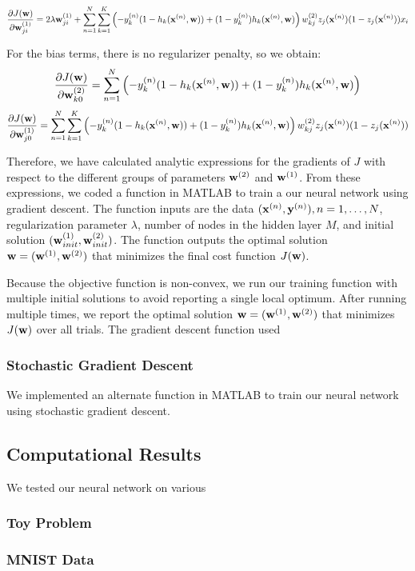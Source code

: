 \begin{equation}
\frac{\partial J(\boldsymbol{\mathbf{w}})}{\partial \boldsymbol{\mathbf{w}}^{(1)}_{ji}} =  2 \lambda \boldsymbol{\mathbf{w}}^{(1)}_{ji} + \sum_{n=1}^{N} \sum_{k=1}^{K} \left(-y_k^{(n)}(1 - h_k(\boldsymbol{\mathbf{x}}^{(n)},\boldsymbol{\mathbf{w}})) + (1-y_k^{(n)})h_k(\boldsymbol{\mathbf{x}}^{(n)},\boldsymbol{\mathbf{w}}) \right)w_{kj}^{(2)} z_j(\boldsymbol{\mathbf{x}}^{(n)})(1-z_j(\boldsymbol{\mathbf{x}}^{(n)})) x_i
\end{equation}

For the bias terms, there is no regularizer penalty, so we obtain:
\begin{equation}
\frac{\partial J(\boldsymbol{\mathbf{w}})}{\partial \boldsymbol{\mathbf{w}}^{(2)}_{k0}} = \sum_{n=1}^{N} \left(-y_k^{(n)}(1 - h_k(\boldsymbol{\mathbf{x}}^{(n)},\boldsymbol{\mathbf{w}})) + (1-y_k^{(n)})h_k(\boldsymbol{\mathbf{x}}^{(n)},\boldsymbol{\mathbf{w}}) \right)
\end{equation}
\begin{equation}
\frac{\partial J(\boldsymbol{\mathbf{w}})}{\partial \boldsymbol{\mathbf{w}}^{(1)}_{j0}} =  \sum_{n=1}^{N} \sum_{k=1}^{K} \left(-y_k^{(n)}(1 - h_k(\boldsymbol{\mathbf{x}}^{(n)},\boldsymbol{\mathbf{w}})) + (1-y_k^{(n)})h_k(\boldsymbol{\mathbf{x}}^{(n)},\boldsymbol{\mathbf{w}}) \right)w_{kj}^{(2)} z_j(\boldsymbol{\mathbf{x}}^{(n)})(1-z_j(\boldsymbol{\mathbf{x}}^{(n)}))
\end{equation}

Therefore, we have calculated analytic expressions for the gradients of $J$ with respect to the different groups of parameters $\boldsymbol{\mathbf{w}}^{(2)}$ and $\boldsymbol{\mathbf{w}}^{(1)}$.  From these expressions, we coded a function in MATLAB to train a our neural network using gradient descent.  The function inputs are the data $(\boldsymbol{\mathbf{x}}^{(n)},\boldsymbol{\mathbf{y}}^{(n)}), n = 1, \ldots, N$, regularization parameter $\lambda$, number of nodes in the hidden layer $M$, and initial solution $(\boldsymbol{\mathbf{w}}^{(1)}_{init}, \boldsymbol{\mathbf{w}}^{(2)}_{init})$.  The function outputs the optimal solution $\boldsymbol{\mathbf{w}} = (\boldsymbol{\mathbf{w}}^{(1)}, \boldsymbol{\mathbf{w}}^{(2)})$ that minimizes the final cost function $J(\boldsymbol{\mathbf{w}})$.  

Because the objective function is non-convex, we run our training function with multiple initial solutions to avoid reporting a single local optimum.  After running multiple times, we report the optimal solution $\boldsymbol{\mathbf{w}} = (\boldsymbol{\mathbf{w}}^{(1)}, \boldsymbol{\mathbf{w}}^{(2)})$ that minimizes $J(\boldsymbol{\mathbf{w}})$ over all trials.  The gradient descent function used 

\subsubsection{Stochastic Gradient Descent}

We implemented an alternate function in MATLAB to train our neural network using stochastic gradient descent.  


\subsection{Computational Results}

We tested our neural network on various 

\subsubsection{Toy Problem}



\subsubsection{MNIST Data}



